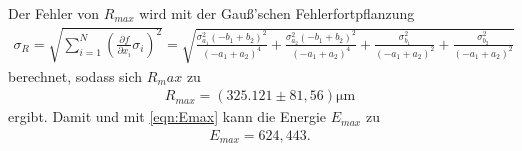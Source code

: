 Der Fehler von $R_{max}$ wird mit der Gauß'schen Fehlerfortpflanzung 
\begin{align*}
  \sigma_R = \sqrt{
      \sum\limits_{i = 1}^N
       \left( \frac{\partial f}{\partial x_i} \sigma_i \right)^{\!\! 2}
     }
     =\sqrt{\frac{\sigma_{a_{1}}^{2} \left(- b_{1} + b_{2}\right)^{2}}{\left(- a_{1} + a_{2}\right)^{4}}
  + \frac{\sigma_{a_{2}}^{2} \left(- b_{1} + b_{2}\right)^{2}}{\left(- a_{1} + a_{2}\right)^{4}} + \frac{\sigma_{b_{1}}^{2}}{\left(- a_{1}
  + a_{2}\right)^{2}} + \frac{\sigma_{b_{2}}^{2}}{\left(- a_{1} + a_{2}\right)^{2}}}
\end{align*}
berechnet, sodass sich $R_max$ zu
\begin{align}
  R_{max}= (325.121 \pm 81,56) \si{\micro\meter}
\end{align}
ergibt. Damit und mit \autoref{eqn:Emax} kann die Energie $E_{max}$ zu
\begin{align}
  E_{max}= 624,443 \si{}.
\end{align}
